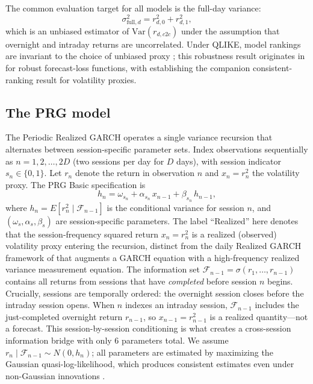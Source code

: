 \documentclass[11pt,a4paper]{article}
\begin{document}
The common evaluation target for all models is the full-day variance:
\begin{equation}
    \sigma^2_{\text{full},d} = r^2_{d,0} + r^2_{d,1},
    \label{eq:target}
\end{equation}
which is an unbiased estimator of $\text{Var}(r_{d,c2c})$ under the assumption that overnight and intraday returns are uncorrelated. Under QLIKE, model rankings are invariant to the choice of unbiased proxy \citep{Patton2011, Hansen2006}; this robustness result originates in \citet{Patton2011} for robust forecast-loss functions, with \citet{Hansen2006} establishing the companion consistent-ranking result for volatility proxies.

\subsection{The PRG model}

The Periodic Realized GARCH operates a single variance recursion that alternates between session-specific parameter sets. Index observations sequentially as $n = 1, 2, \ldots, 2D$ (two sessions per day for $D$ days), with session indicator $s_n \in \{0, 1\}$. Let $r_n$ denote the return in observation $n$ and $x_n = r^2_n$ the volatility proxy. The PRG Basic specification is
\begin{equation}
    h_n = \omega_{s_n} + \alpha_{s_n} \, x_{n-1} + \beta_{s_n} \, h_{n-1},
    \label{eq:prg_basic}
\end{equation}
where $h_n = E[r^2_n \mid \mathcal{F}_{n-1}]$ is the conditional variance for session $n$, and $(\omega_s, \alpha_s, \beta_s)$ are session-specific parameters. The label ``Realized'' here denotes that the session-frequency squared return $x_n = r^2_n$ is a realized (observed) volatility proxy entering the recursion, distinct from the daily Realized GARCH framework of \citet{Hansen2012} that augments a GARCH equation with a high-frequency realized variance measurement equation. The information set $\mathcal{F}_{n-1} = \sigma(r_1, \ldots, r_{n-1})$ contains all returns from sessions that have \emph{completed} before session $n$ begins. Crucially, sessions are temporally ordered: the overnight session closes before the intraday session opens. When $n$ indexes an intraday session, $\mathcal{F}_{n-1}$ includes the just-completed overnight return $r_{n-1}$, so $x_{n-1} = r^2_{n-1}$ is a realized quantity---not a forecast. This session-by-session conditioning is what creates a cross-session information bridge with only 6 parameters total. We assume $r_n \mid \mathcal{F}_{n-1} \sim N(0, h_n)$; all parameters are estimated by maximizing the Gaussian quasi-log-likelihood, which produces consistent estimates even under non-Gaussian innovations \citep{BollerslevWooldridge1992}.
\end{document}
